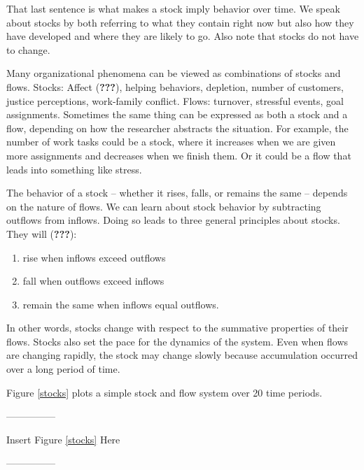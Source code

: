 \documentclass[english,,man]{apa6}
\providecommand{\tightlist}{%
  \setlength{\itemsep}{0pt}\setlength{\parskip}{0pt}}
\theoremstyle{definition}
\theoremstyle{definition}
\theoremstyle{definition}
\theoremstyle{remark}
\begin{document}
\noindent That last sentence is what makes a stock imply behavior over
time. We speak about stocks by both referring to what they contain right
now but also how they have developed and where they are likely to go.
Also note that stocks do not have to change.

Many organizational phenomena can be viewed as combinations of stocks
and flows. Stocks: Affect ({\textbf{???}}), helping behaviors,
depletion, number of customers, justice perceptions, work-family
conflict. Flows: turnover, stressful events, goal assignments. Sometimes
the same thing can be expressed as both a stock and a flow, depending on
how the researcher abstracts the situation. For example, the number of
work tasks could be a stock, where it increases when we are given more
assignments and decreases when we finish them. Or it could be a flow
that leads into something like stress.

The behavior of a stock -- whether it rises, falls, or remains the same
-- depends on the nature of flows. We can learn about stock behavior by
subtracting outflows from inflows. Doing so leads to three general
principles about stocks. They will ({\textbf{???}}):

\begin{enumerate}
\def\labelenumi{\arabic{enumi}.}
\tightlist
\item
  rise when inflows exceed outflows
\item
  fall when outflows exceed inflows
\item
  remain the same when inflows equal outflows.
\end{enumerate}

\noindent In other words, stocks change with respect to the summative
properties of their flows. Stocks also set the pace for the dynamics of
the system. Even when flows are changing rapidly, the stock may change
slowly because accumulation occurred over a long period of time.

Figure \ref{stocks} plots a simple stock and flow system over 20 time
periods.

\begin{center}

---------------

Insert Figure \ref{stocks} Here

---------------

\end{center}
\end{document}
